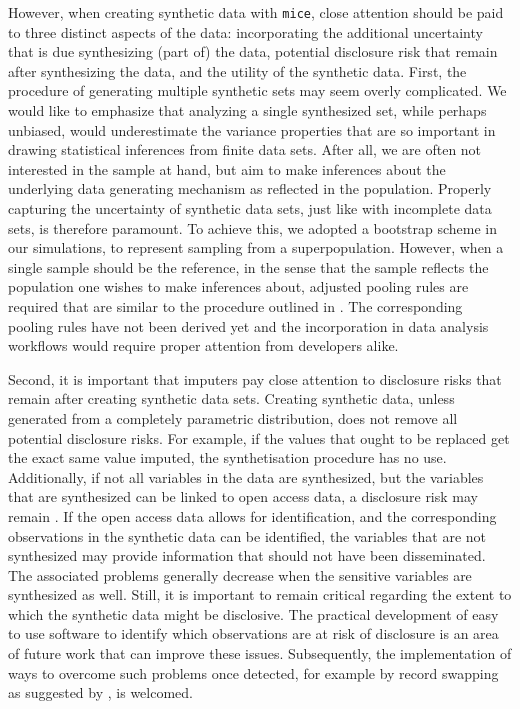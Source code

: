 \documentclass[psych,article,submit,moreauthors,pdftex]{mdpi}
\begin{document}
However, when creating synthetic data with \texttt{mice}, close
attention should be paid to three distinct aspects of the data:
incorporating the additional uncertainty that is due synthesizing (part
of) the data, potential disclosure risk that remain after synthesizing
the data, and the utility of the synthetic data. First, the procedure of
generating multiple synthetic sets may seem overly complicated. We would
like to emphasize that analyzing a single synthesized set, while perhaps
unbiased, would underestimate the variance properties that are so
important in drawing statistical inferences from finite data sets. After
all, we are often not interested in the sample at hand, but aim to make
inferences about the underlying data generating mechanism as reflected
in the population. Properly capturing the uncertainty of synthetic data
sets, just like with incomplete data sets, is therefore paramount. To
achieve this, we adopted a bootstrap scheme in our simulations, to
represent sampling from a superpopulation. However, when a single sample
should be the reference, in the sense that the sample reflects the
population one wishes to make inferences about, adjusted pooling rules
are required that are similar to the procedure outlined in
\citet{vink2014pooling}. The corresponding pooling rules have not been
derived yet and the incorporation in data analysis workflows would
require proper attention from developers alike.

Second, it is important that imputers pay close attention to disclosure
risks that remain after creating synthetic data sets. Creating synthetic
data, unless generated from a completely parametric distribution, does
not remove all potential disclosure risks. For example, if the values
that ought to be replaced get the exact same value imputed, the
synthetisation procedure has no use. Additionally, if not all variables
in the data are synthesized, but the variables that are synthesized can
be linked to open access data, a disclosure risk may remain
\citep{drechsler2011empirical}. If the open access data allows for
identification, and the corresponding observations in the synthetic data
can be identified, the variables that are not synthesized may provide
information that should not have been disseminated. The associated
problems generally decrease when the sensitive variables are synthesized
as well. Still, it is important to remain critical regarding the extent
to which the synthetic data might be disclosive. The practical
development of easy to use software to identify which observations are
at risk of disclosure is an area of future work that can improve these
issues. Subsequently, the implementation of ways to overcome such
problems once detected, for example by record swapping as suggested by
\citet{jiang2021balancing}, is welcomed.
\end{document}

